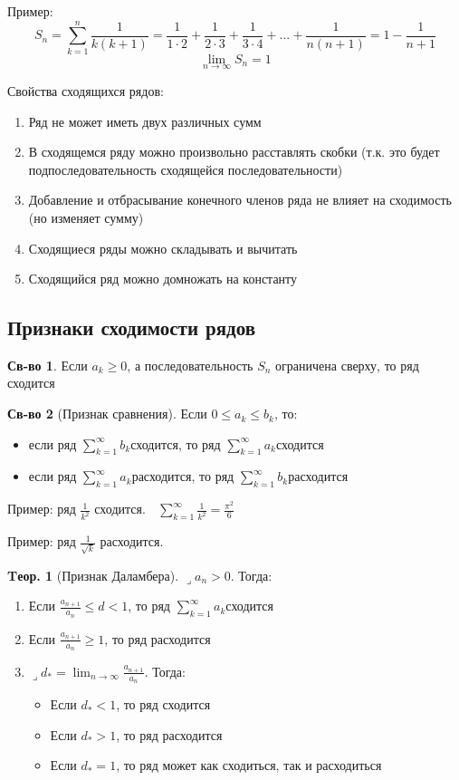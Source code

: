 \documentclass[a4paper,12pt]{article}
\numberwithin{figure}{section}
\theoremstyle{definition}
\newtheorem*{property}{Св-во}   %
\newtheorem{theorem}{Tеор.}[section]
\def\DS{\displaystyle}
\def\ntoinf{n\to\infty}
\def\leqs{\leqslant}
\def\geqs{\geqslant}
\def\lets{{\huge$\lrcorner$}\space}
\def\rowak{$\DS\sum_{k=1}^{\infty}a_k$\space}
\begin{document}
\bigbreak
Пример:
\[ S_n = \sum_{k=1}^n \frac1{k(k+1)}
       = \frac1{1\cdot2} + \frac1{2\cdot3} + \frac1{3\cdot4} + ... + \frac1{n(n+1)}
       = 1 - \frac1{n+1} \]
\[ \lim_{\ntoinf}S_n = 1 \]


Свойства сходящихся рядов:
\begin{enumerate}
	\item Ряд не может иметь двух различных сумм
	\item В сходящемся ряду можно произвольно расставлять скобки
		  (т.к. это будет подпоследовательность сходящейся последовательности)
	\item Добавление и отбрасывание конечного членов ряда не влияет на сходимость (но изменяет сумму)
	\item Сходящиеся ряды можно складывать и вычитать
	\item Сходящийся ряд можно домножать на константу
\end{enumerate}


\subsection{Признаки сходимости рядов}

\begin{property}
	Если $a_k\geqs0$, а последовательность $S_n$ ограничена сверху, то ряд сходится
\end{property}

\begin{property}[Признак сравнения]
	Если $0 \leqs a_k \leqs b_k$, то:
	\begin{itemize}
		\def\rowbk{$\DS\sum_{k=1}^{\infty}b_k$\space}
		\item если ряд \rowbk сходится, то ряд \rowak сходится
		\item если ряд \rowak расходится, то ряд \rowbk расходится
	\end{itemize}
\end{property}

Пример: ряд $\DS\frac1{k^2}$ сходится. $\;$
$\DS\sum_{k=1}^\infty \frac1{k^2} = \frac{\pi^2}6 $

\bigbreak
Пример: ряд $\DS\frac1{\sqrt{k}}$ расходится.

\begin{theorem}[Признак Даламбера]
  \lets $a_n > 0$. Тогда:
  \begin{enumerate}
	\item Если $\DS\frac{a_{n+1}}{a_n} \leqs d < 1$, то ряд \rowak сходится
	\item Если $\DS\frac{a_{n+1}}{a_n} \geqs 1$, то ряд расходится
	\item \lets $\DS d_* = \lim_{\ntoinf} \frac{a_{n+1}}{a_n}$. Тогда:
	  \begin{itemize}
	  	\item Если $d_* < 1$, то ряд сходится
	  	\item Если $d_* > 1$, то ряд расходится
	  	\item Если $d_* = 1$, то ряд может как сходиться, так и расходиться
	  \end{itemize}
  \end{enumerate}
\end{theorem}
\end{document}
